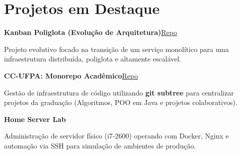 \section*{Projetos em Destaque}

\noindent\textbf{Kanban Poliglota (Evolução de Arquitetura)}\hfill\href{https://github.com/reali-705/kanban_poliglota}{\faGithub \space Repo}\par
\noindent\hspace*{1em}Projeto evolutivo focado na transição de um serviço monolítico para uma infraestrutura distribuída, poliglota e altamente escalável. \par
\vspace{4pt}

\noindent\textbf{CC-UFPA: Monorepo Acadêmico}\hfill\href{https://github.com/reali-705/cc-ufpa}{\faGithub \space Repo}\par
\noindent\hspace*{1em}Gestão de infraestrutura de código utilizando \textbf{git subtree} para centralizar projetos da graduação (Algoritmos, POO em Java e projetos colaborativos). \par
\vspace{4pt}

\noindent\textbf{Home Server Lab}\hfill\href{https://github.com/reali-705}{\faExternalLink*}\par
\noindent\hspace*{1em}Administração de servidor físico (i7-2600) operando com Docker, Nginx e automação via SSH para simulação de ambientes de produção.